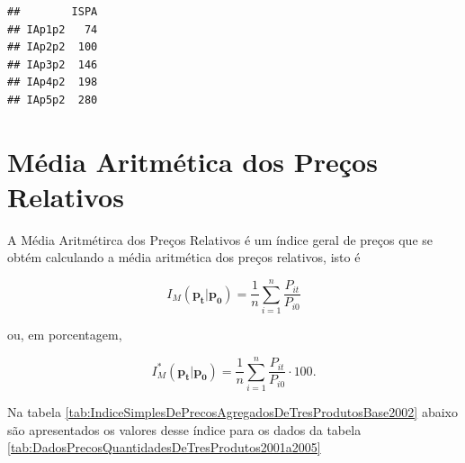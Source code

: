 \documentclass[
]{book}
\begin{document}
\begin{verbatim}
##        ISPA
## IAp1p2   74
## IAp2p2  100
## IAp3p2  146
## IAp4p2  198
## IAp5p2  280
\end{verbatim}

\hypertarget{muxe9dia-aritmuxe9tica-dos-preuxe7os-relativos}{%
\section{Média Aritmética dos Preços Relativos}\label{muxe9dia-aritmuxe9tica-dos-preuxe7os-relativos}}

A Média Aritmétirca dos Preços Relativos é um índice geral de preços que se obtém calculando a média aritmética dos preços relativos, isto é

\begin{equation}
  I_M(\mathbf{p_t}| \mathbf{p_0}) = \frac{1}{n}
  \sum_{i=1}^{n}\frac{P_{it}}{P_{i0}}
  \label{eq:MediaAritmeticaPrecosRelativos}
\end{equation}

ou, em porcentagem,

\begin{equation}
  I_M^*(\mathbf{p_t}| \mathbf{p_0}) = \frac{1}{n}
  \sum_{i=1}^{n}\frac{P_{it}}{P_{i0}} \cdot 100.
  \label{eq:MediaAritmeticaPrecosRelativosPorcentagem}
\end{equation}

Na tabela \ref{tab:IndiceSimplesDePrecosAgregadosDeTresProdutosBase2002} abaixo são apresentados os valores desse índice para os dados da tabela \ref{tab:DadosPrecosQuantidadesDeTresProdutos2001a2005}
\end{document}
